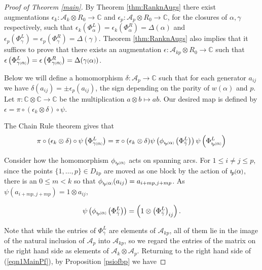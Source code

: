 \documentclass[11pt]{amsart}
\def\C{{\mathbb C}}
\def\A{{\mathcal A}}
\newcommand*{\smallp}[1]{\scalebox{.75}{\ensuremath#1}}
\newcommand*{\subsmallp}[1]{\scalebox{.5}{\ensuremath#1}}
\newcommand{\pp}[2][p]{\imath_{\hspace*{-1pt}#1}\hspace*{-.5pt}\smallp(#2\smallp)}
\newcommand{\subpp}[2][p]{\imath_{\hspace*{-1pt}#1}\hspace*{-.5pt}\subsmallp(#2\subsmallp)}
\theoremstyle{definition}
\begin{document}
\begin{proof}[Proof of Theorem \ref{main}]
By Theorem \ref{thm:RanknAugs} there exist augmentations $\epsilon_k\colon \A_k\otimes R_0 \rightarrow \C$ and $\epsilon_p\colon \A_p\otimes R_0 \rightarrow \C$, for the closures of $\alpha,\gamma$ respectively, such that $\epsilon_k\left(\Phi_\alpha^L\right) = \epsilon_k\left(\Phi_\alpha^R\right) = \Delta(\alpha)$ and $\epsilon_p\left(\Phi_{\gamma}^L\right) = \epsilon_p\left(\Phi_{\gamma}^R\right) = \Delta(\gamma)$. Theorem \ref{thm:RanknAugs} also implies that it suffices to prove that there exists an augmentation $\epsilon\colon \A_{kp}\otimes R_0\rightarrow \C$ such that $\epsilon\left(\Phi_{\gamma\subsmallp(\alpha\subsmallp)}^L\right) = \epsilon\left(\Phi_{\gamma\subsmallp(\alpha\subsmallp)}^R\right) = \Delta(\gamma\smallp(\alpha\smallp))$.


Below we will define a homomorphism $\delta\colon\A_p\rightarrow \C$ such that for each generator $a_{ij}$ we have $\delta(a_{ij}) = \pm \epsilon_p(a_{ij})$, the sign depending on the parity of $w(\alpha)$ and $p$. Let $\pi\colon \C\otimes \C \rightarrow \C$ be the multiplication $a\otimes b\mapsto ab$. Our desired map is defined by $\epsilon = \pi\circ(\epsilon_k\otimes\delta)\circ\psi$.


The Chain Rule theorem gives that
\begin{equation}
\pi\circ(\epsilon_k\otimes\delta)\circ\psi\left(\Phi_{\gamma\subsmallp(\alpha\subsmallp)}^L\right) = \pi\circ(\epsilon_k\otimes\delta)\psi\left(\phi_{\subpp\alpha}\left(\Phi_{\bar\gamma}^L\right)\right)\psi\left(\Phi_{\subpp\alpha}^L\right)
\label{eqn1MainPf}
\end{equation}

Consider how the homomorphism $\phi_{\subpp\alpha}$ acts on spanning arcs. For $1\le i\ne j\le p$, since the points $\{1,\ldots,p\}\in D_{kp}$ are moved as one block by the action of $\pp\alpha$, there is an $0\le m<k$ so that $\phi_{\subpp\alpha}(a_{ij})=a_{i+mp,j+mp}$. As $\psi(a_{i + mp, j+mp})=1\otimes a_{ij}$,

$$\psi\left(\phi_{\subpp\alpha}\left(\Phi_{\bar\gamma}^L\right)\right) = \left(1\otimes \left(\Phi_{\bar\gamma}^L\right)_{ij}\right).$$

Note that while the entries of $\Phi_{\bar\gamma}^L$ are elements of $\A_{kp}$, all of them lie in the image of the natural inclusion of $\A_p$ into $\A_{kp}$, so we regard the entries of the matrix on the right hand side as elements of $\A_k\otimes \A_p$. Returning to the right hand side of (\ref{eqn1MainPf}), by Proposition \ref{psiofbp} we have


\end{proof}
\end{document}
